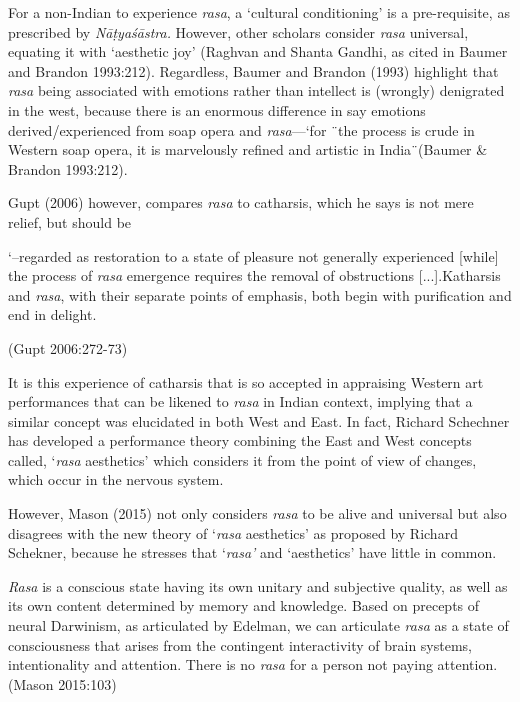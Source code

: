 For a non-Indian to experience \textsl{rasa}, a ‘cultural conditioning’ is a pre-requisite, as prescribed by \textsl{Nāṭyaśāstra.} However, other scholars consider \textsl{rasa} universal, equating it with ‘aesthetic joy’ (Raghvan and Shanta Gandhi, as cited in Baumer and Brandon 1993:212).  Regardless, Baumer and Brandon (1993) highlight that \textsl{rasa} being associated with emotions rather than intellect is (wrongly) denigrated in the west, because there is an enormous difference in say emotions derived/experienced from soap opera and \textsl{rasa}---‘for ¨the process is crude in Western soap opera, it is marvelously refined and artistic in India¨(Baumer \& Brandon 1993:212).


Gupt (2006) however, compares \textsl{rasa} to catharsis, which he says is not mere relief, but should be 

\begin{myquote}
‘--regarded as restoration to a state of pleasure not generally experienced [while] the process of \textsl{rasa} emergence requires the removal of obstructions [...].Katharsis and \textsl{rasa}, with their separate points of emphasis, both begin with purification and end in delight. 

\hfill (Gupt 2006:272-73)
\end{myquote}


It is this experience of catharsis that is so accepted in appraising Western art performances that can be likened to \textsl{rasa} in Indian context, implying that a similar concept was elucidated in both West and East. In fact, Richard Schechner has developed a performance theory combining the East and West concepts called, ‘\textsl{rasa} aesthetics’ which considers it from the point of view of changes, which occur in the nervous system. 

However, Mason (2015) not only considers \textsl{rasa} to be alive and universal but also disagrees with the new theory of ‘\textsl{rasa} aesthetics’ as proposed by Richard Schekner, because he stresses that ‘\textsl{rasa’} and ‘aesthetics’ have little in common. 

\begin{myquote}
\textsl{Rasa} is a conscious state having its own unitary and subjective quality, as well as its 
own content determined by memory and knowledge. Based on precepts of neural Darwinism, as articulated by Edelman, we can articulate \textsl{rasa} as a state of consciousness that arises from the contingent interactivity of brain systems, intentionality and attention. There is no \textsl{rasa} for a person not paying attention.    
\hfill (Mason 2015:103)
\end{myquote}

